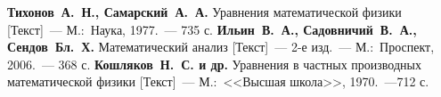 

\begin{thebibliography}{99}
  
 \textbf{Тихонов~А.~Н., Самарский~А.~А.} Уравнения математической физики [Текст]~--- М.:~Наука, 1977.~--- 735 с.
 \textbf{Ильин~В.~А., Садовничий~В.~А., Сендов~Бл.~Х.} Математический анализ [Текст]~--- 2-е изд.~--- М.:~Проспект, 2006.~--- 368 с.
 \textbf{Кошляков~Н.~С. и др.} Уравнения в частных производных математической физики [Текст]~--- М.:~<<Высшая школа>>, 1970.~---712 с.
\end{thebibliography}
